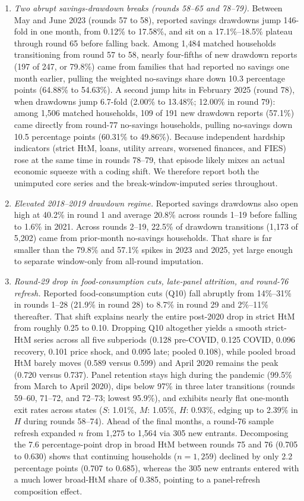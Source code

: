 \documentclass[11pt]{article}
\begin{document}
\begin{enumerate}
\item \textit{Two abrupt savings-drawdown breaks (rounds 58--65 and 78--79).} Between May and June 2023 (rounds 57 to 58), reported savings drawdowns jump 146-fold in one month, from 0.12\% to 17.58\%, and sit on a 17.1\%--18.5\% plateau through round 65 before falling back. Among 1,484 matched households transitioning from round 57 to 58, nearly four-fifths of new drawdown reports (197 of 247, or 79.8\%) came from families that had reported no savings one month earlier, pulling the weighted no-savings share down 10.3 percentage points (64.88\% to 54.63\%). A second jump hits in February 2025 (round 78), when drawdowns jump 6.7-fold (2.00\% to 13.48\%; 12.00\% in round 79): among 1,506 matched households, 109 of 191 new drawdown reports (57.1\%) came directly from round-77 no-savings households, pulling no-savings down 10.5 percentage points (60.31\% to 49.86\%). Because independent hardship indicators (strict HtM, loans, utility arrears, worsened finances, and FIES) rose at the same time in rounds 78--79, that episode likely mixes an actual economic squeeze with a coding shift. We therefore report both the unimputed core series and the break-window-imputed series throughout.

\item \textit{Elevated 2018--2019 drawdown regime.} Reported savings drawdowns also open high at 40.2\% in round 1 and average 20.8\% across rounds 1--19 before falling to 1.6\% in 2021. Across rounds 2--19, 22.5\% of drawdown transitions (1,173 of 5,202) came from prior-month no-savings households. That share is far smaller than the 79.8\% and 57.1\% spikes in 2023 and 2025, yet large enough to separate window-only from all-round imputation.

\item \textit{Round-29 drop in food-consumption cuts, late-panel attrition, and round-76 refresh.} Reported food-consumption cuts (Q10) fall abruptly from 14\%--31\% in rounds 1--28 (21.9\% in round 28) to 8.7\% in round 29 and 2\%--11\% thereafter. That shift explains nearly the entire post-2020 drop in strict HtM from roughly 0.25 to 0.10. Dropping Q10 altogether yields a smooth strict-HtM series across all five subperiods (0.128 pre-COVID, 0.125 COVID, 0.096 recovery, 0.101 price shock, and 0.095 late; pooled 0.108), while pooled broad HtM barely moves (0.589 versus 0.599) and April 2020 remains the peak (0.720 versus 0.737). Panel retention stays high during the pandemic (99.5\% from March to April 2020), dips below 97\% in three later transitions (rounds 59--60, 71--72, and 72--73; lowest 95.9\%), and exhibits nearly flat one-month exit rates across states ($S$: 1.01\%, $M$: 1.05\%, $H$: 0.93\%, edging up to 2.39\% in $H$ during rounds 58--74). Ahead of the final months, a round-76 sample refresh expanded $n$ from 1,275 to 1,564 via 305 new entrants. Decomposing the 7.6 percentage-point drop in broad HtM between rounds 75 and 76 (0.705 to 0.630) shows that continuing households ($n = 1{,}259$) declined by only 2.2 percentage points (0.707 to 0.685), whereas the 305 new entrants entered with a much lower broad-HtM share of 0.385, pointing to a panel-refresh composition effect.
\end{enumerate}
\end{document}
